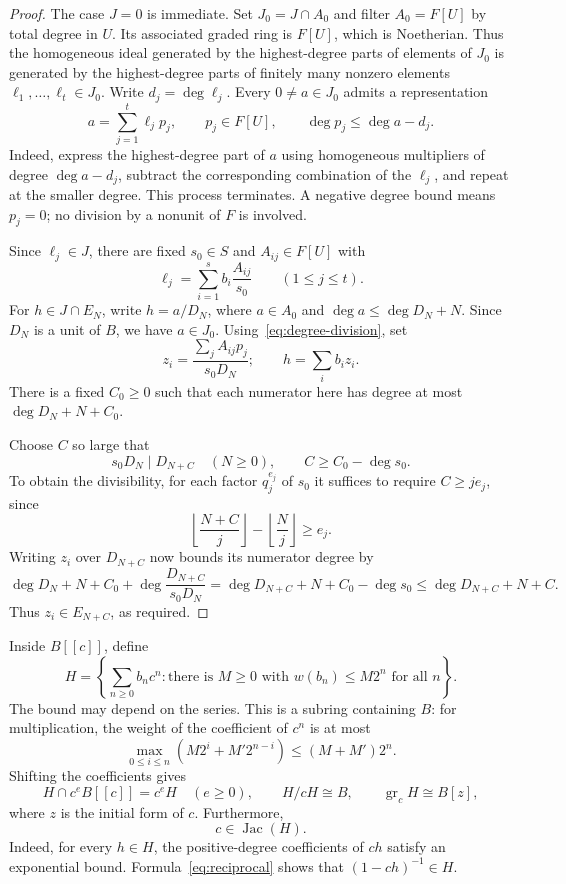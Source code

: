 \documentclass[11pt,reqno]{amsart}
\numberwithin{equation}{section}
\theoremstyle{plain}
\theoremstyle{definition}
\theoremstyle{remark}
\DeclareMathOperator{\Jac}{Jac}
\DeclareMathOperator{\gr}{gr}
\begin{document}
\begin{proof}
The case $J=0$ is immediate. Set $J_0=J\cap A_0$ and filter
$A_0=F[U]$ by total degree in $U$. Its associated graded ring is
$F[U]$, which is Noetherian. Thus the homogeneous ideal generated
by the highest-degree parts of elements of $J_0$ is generated by
the highest-degree parts of finitely many nonzero elements
$\ell_1,\ldots,\ell_t\in J_0$. Write $d_j=\deg\ell_j$.
Every $0\ne a\in J_0$ admits a representation
\begin{equation}\label{eq:degree-division}
 a=\sum_{j=1}^{t}\ell_jp_j,\qquad
 p_j\in F[U],\qquad \deg p_j\le\deg a-d_j.
\end{equation}
Indeed, express the highest-degree part of $a$ using homogeneous
multipliers of degree $\deg a-d_j$, subtract the corresponding
combination of the $\ell_j$, and repeat at the smaller degree.
This process terminates. A negative degree bound means $p_j=0$;
no division by a nonunit of $F$ is involved.

Since $\ell_j\in J$, there are fixed $s_0\in S$ and
$A_{ij}\in F[U]$ with
\[
 \ell_j=\sum_{i=1}^{s}b_i\frac{A_{ij}}{s_0}
 \qquad(1\le j\le t).
\]
For $h\in J\cap E_N$, write $h=a/D_N$, where
$a\in A_0$ and $\deg a\le\deg D_N+N$.
Since $D_N$ is a unit of $B$, we have $a\in J_0$.
Using~\eqref{eq:degree-division}, set
\[
 z_i=\frac{\sum_j A_{ij}p_j}{s_0D_N};
 \qquad h=\sum_i b_i z_i.
\]
There is a fixed $C_0\ge0$ such that each numerator here has degree
at most $\deg D_N+N+C_0$.

Choose $C$ so large that
\begin{equation}\label{eq:denominator-shift}
 s_0D_N\mid D_{N+C}\quad(N\ge0),\qquad C\ge C_0-\deg s_0.
\end{equation}
To obtain the divisibility, for each factor $q_j^{e_j}$ of $s_0$
it suffices to require $C\ge je_j$, since
\[
 \left\lfloor\frac{N+C}{j}\right\rfloor
 -\left\lfloor\frac{N}{j}\right\rfloor\ge e_j.
\]
Writing $z_i$ over $D_{N+C}$ now bounds its numerator degree by
\[
 \deg D_N+N+C_0+\deg\frac{D_{N+C}}{s_0D_N}
 =\deg D_{N+C}+N+C_0-\deg s_0
 \le\deg D_{N+C}+N+C.
\]
Thus $z_i\in E_{N+C}$, as required.
\end{proof}

Inside $B[[c]]$, define
\begin{equation}\label{eq:H}
 H=\left\{\sum_{n\ge0}b_nc^n:
       \text{there is }M\ge0\text{ with }w(b_n)\le M2^n
       \text{ for all }n\right\}.
\end{equation}
The bound may depend on the series. This is a subring containing
$B$: for multiplication, the weight of the coefficient of $c^n$
is at most
\[
 \max_{0\le i\le n}(M2^i+M'2^{n-i})\le(M+M')2^n.
\]
Shifting the coefficients gives
\begin{equation}\label{eq:Hgraded}
 H\cap c^eB[[c]]=c^eH\quad(e\ge0),\qquad
 H/cH\cong B,\qquad \gr_cH\cong B[z],
\end{equation}
where $z$ is the initial form of $c$. Furthermore,
\begin{equation}\label{eq:jacobson}
 c\in\Jac(H).
\end{equation}
Indeed, for every $h\in H$, the positive-degree coefficients of
$ch$ satisfy an exponential bound. Formula~\eqref{eq:reciprocal}
shows that $(1-ch)^{-1}\in H$.
\end{document}
